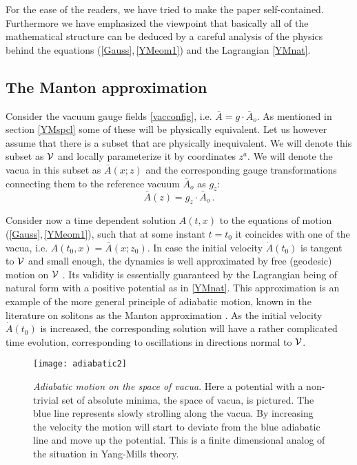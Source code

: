 \documentclass[11pt,a4paper]{article}
\def\calv{{\cal V}}
\begin{document}
    For the ease of the readers, we have tried to make the paper self-contained. Furthermore we have emphasized the viewpoint that basically all of the mathematical structure can be deduced by a careful analysis of the physics behind the equations (\ref{Gauss},\,\ref{YMeom1}) and the Lagrangian \eqref{YMnat}.   
    
    \subsection{The Manton approximation}
    Consider the vacuum gauge fields \eqref{vacconfig}, i.e. $\bar A=g\cdot \bar A_o$. As mentioned in section \ref{YMspcl} some of these will be physically equivalent. Let us however assume that there is a subset that are physically inequivalent. We will denote this subset as $\calv$ and locally parameterize it by coordinates $z^a$. We will denote the vacua in this subset as $\bar A(x;z)$ and the corresponding gauge transformations connecting them to the reference vacuum $\bar A_o$ as $g_z$:
    \begin{equation}
    \bar A(z)=g_z\cdot\bar A_o\,.
    \end{equation}
    
    Consider now a time dependent solution $A(t,x)$ to the equations of motion (\ref{Gauss},\,\ref{YMeom1}), such that at some instant $t=t_0$ it coincides with  one of the vacua, i.e. $A(t_0,x)=\bar A(x;z_0)$.  In case the initial velocity $\dot A(t_0)$ is tangent to $\calv$ and small enough, the dynamics is well approximated by free (geodesic) motion on $\calv$ \cite{Stuart:2007zz}. Its validity is essentially guaranteed by the Lagrangian being of natural form with a positive potential as in \eqref{YMnat}. This approximation is an example of the more general principle of adiabatic motion, known in the literature on solitons as the Manton approximation \cite{Manton:1981mp}. As the initial velocity $\dot A(t_0)$ is increased, the corresponding solution will have a rather complicated time evolution, corresponding to oscillations in directions normal to $\calv$.

\begin{figure}
    \centering
    \texttt{[image: adiabatic2]}
    \captionsetup{width=0.8\textwidth}
    \vspace{-1.8cm}
    \caption{\textit{Adiabatic motion on the space of vacua}. Here a potential with a non-trivial set of absolute minima, the space of vacua, is pictured. The blue line represents slowly strolling along the vacua. By increasing the velocity the motion will start to deviate from the blue adiabatic line and move up the potential. This is a finite dimensional analog of the situation in Yang-Mills theory.}
    \label{fig:adiabatic}
\end{figure}
\end{document}
